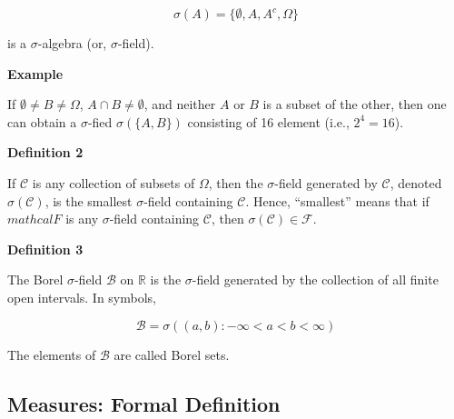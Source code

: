 \documentclass[]{book}
\begin{document}
\[\sigma(A)=\{\emptyset, A, A^c, \Omega\}\]

is a \(\sigma\)-algebra (or, \(\sigma\)-field).

\textbf{Example}

If \(\emptyset \neq B \neq \Omega\), \(A\cap B \neq \emptyset\), and neither \(A\) or \(B\) is a subset of the other, then one can obtain a \(\sigma\)-fied \(\sigma(\{A, B\})\) consisting of 16 element (i.e., \(2^4=16\)).

\textbf{Definition 2}

If \(\mathcal{C}\) is any collection of subsets of \(\Omega\), then the \(\sigma\)-field generated by \(\mathcal{C}\), denoted \(\sigma(\mathcal{C})\), is the smallest \(\sigma\)-field containing \(\mathcal{C}\). Hence, ``smallest'' means that if \(mathcal{F}\) is any \(\sigma\)-field containing \(\mathcal{C}\), then \(\sigma(\mathcal{C}) \in \mathcal{F}\).

\textbf{Definition 3}

The Borel \(\sigma\)-field \(\mathcal{B}\) on \(\mathbb{R}\) is the \(\sigma\)-field generated by the collection of all finite open intervals. In symbols,

\[\mathcal{B}=\sigma({(a,b): -\infty < a <b< \infty})\]

The elements of \(\mathcal{B}\) are called Borel sets.

\hypertarget{measures-formal-definition}{%
\subsection{Measures: Formal Definition}\label{measures-formal-definition}}


\end{document}

